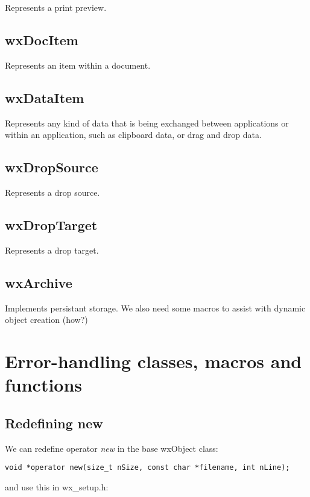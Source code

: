 Represents a print preview.

\subsection{wxDocItem}

Represents an item within a document.

\subsection{wxDataItem}

Represents any kind of data that is being exchanged between applications or
within an application, such as clipboard data, or drag and drop data.

\subsection{wxDropSource}

Represents a drop source.

\subsection{wxDropTarget}

Represents a drop target.

\subsection{wxArchive}

Implements persistant storage. We also need some macros to assist with
dynamic object creation (how?)

\section{Error-handling classes, macros and functions}

\subsection{Redefining new}

We can redefine operator {\it new} in the base wxObject class:

\begin{verbatim}
void *operator new(size_t nSize, const char *filename, int nLine);
\end{verbatim}

and use this in wx\_setup.h:

